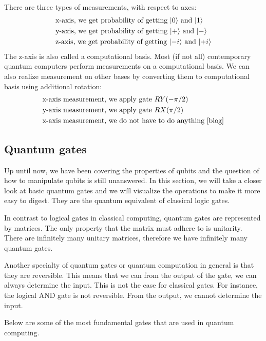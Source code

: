 There are three types of measurements, with respect to axes:
\begin{align*}
&\text{x-axis, we get probability of getting }\lvert0\rangle \text{ and }\lvert1\rangle\\
&\text{y-axis, we get probability of getting }\lvert+\rangle \text{ and }\lvert-\rangle\\
&\text{z-axis, we get probability of getting }\lvert-i\rangle \text{ and }\lvert+i\rangle
\end{align*}
The z-axis is also called a computational basis. Most (if not all) contemporary quantum computers perform measurements on a computational basis. We can also realize measurement on other bases by converting them to computational basis using additional rotation:
\begin{align*}
    &\text{x-axis measurement, we apply gate } RY(-\pi/2) \\
    &\text{y-axis measurement, we apply gate } RX(\pi/2) \\
    &\text{x-axis measurement, we do not have to do anything \cite{blog}}
\end{align*}


\subsection{Quantum gates}
Up until now, we have been covering the properties of qubits and the question of how to manipulate qubits is still unanswered. In this section, we will take a closer look at basic quantum gates and we will visualize the operations to make it more easy to digest. They are the quantum equivalent of classical logic gates.

In contrast to logical gates in classical computing, quantum gates are represented by matrices. The only property that the matrix must adhere to is unitarity. There are infinitely many unitary matrices, therefore we have infinitely many quantum gates. \cite{qc}

Another specialty of quantum gates or quantum computation in general is that they are reversible. This means that we can from the output of the gate, we can always determine the input. This is not the case for classical gates. For instance, the logical AND gate is not reversible. From the output, we cannot determine the input. \cite{qc}

Below are some of the most fundamental gates that are used in quantum computing.

